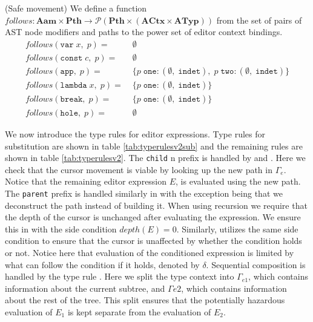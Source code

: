 \theoremstyle{definition}
\begin{definition}{(Safe movement)}
We define a function $follows: \mathbf{Aam} \times \mathbf{Pth} \rightarrow \mathcal{P}\left(\mathbf{Pth} \times \left(\mathbf{ACtx} \times \mathbf{ATyp}\right)\right)$ from the set of pairs of AST node modifiers and paths to the power set of editor context bindings.
\begin{align*}
    \textit{follows}(\texttt{var}\; x,\; p)=&\; \emptyset\\
    \textit{follows}(\texttt{const}\; c,\; p)=&\; \emptyset\\
    \textit{follows}(\texttt{app},\; p)=&\; \{p\; \texttt{one} : (\emptyset,\; \texttt{indet}),\; p\; \texttt{two} : (\emptyset,\; \texttt{indet})\}\\
    \textit{follows}(\texttt{lambda}\; x,\; p)=&\; \{p\; \texttt{one} : (\emptyset,\; \texttt{indet})\}\\
    \textit{follows}(\texttt{break},\; p)=&\; \{p\; \texttt{one} : (\emptyset,\; \texttt{indet})\}\\
    \textit{follows}(\texttt{hole},\; p)=&\; \emptyset
\end{align*}
\end{definition}

%
%
We now introduce the type rules for editor expressions. Type rules for substitution are shown in table \ref{tab:typerulesv2sub} and the remaining rules are shown in table \ref{tab:typerulesv2}. The \texttt{child} n prefix is handled by  and . Here we check that the cursor movement is viable by looking up the new path in $\Gamma_e$. Notice that the remaining editor expression $E$, is evaluated using the new path. The \texttt{parent} prefix is handled similarly in  with the exception being that we deconstruct the path instead of building it. When using recursion we require that the depth of the cursor is unchanged after evaluating the expression. We ensure this in  with the side condition $depth(E) = 0$. Similarly,  utilizes the same side condition to ensure that the cursor is unaffected by whether the condition holds or not. Notice here that evaluation of the conditioned expression is limited by what can follow the condition if it holds, denoted by $\delta$. Sequential composition is handled by the type rule . Here we split the type context into $\Gamma_{e1}$, which contains information about the current subtree, and $\Gamma{e2}$, which contains information about the rest of the tree. This split ensures that the potentially hazardous evaluation of $E_1$ is kept separate from the evaluation of $E_2$.\\

